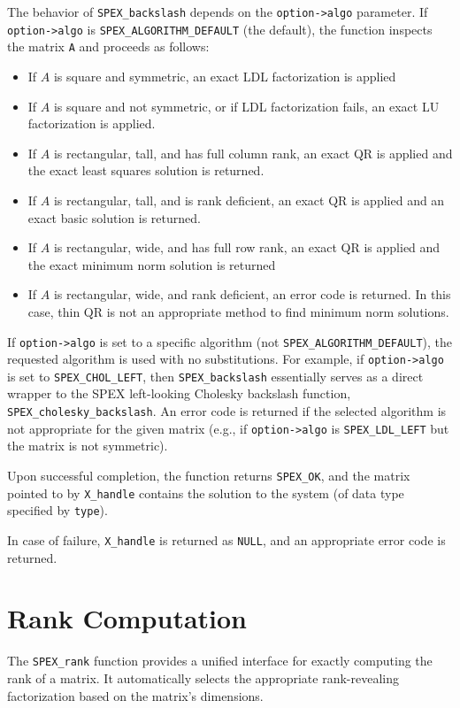 \documentclass[12pt,oneside]{book}
\theoremstyle{definition}
\begin{document}
The behavior of \verb|SPEX_backslash| depends on the \verb|option->algo|
parameter. If \verb|option->algo| is \verb|SPEX_ALGORITHM_DEFAULT| (the
default), the function inspects the matrix \verb|A| and proceeds as follows:
\begin{itemize}
    \item If $A$ is square and symmetric, an exact LDL factorization is applied
    \item If $A$ is square and not symmetric, or if LDL factorization fails, an exact LU factorization is applied.
    \item If $A$ is rectangular, tall, and has full column rank, an exact QR is applied and the exact least squares solution is returned.
    \item If $A$ is rectangular, tall, and is rank deficient, an exact QR is applied and an exact basic solution is returned.
    \item If $A$ is rectangular, wide, and has full row rank, an exact QR is applied and the exact minimum norm solution is returned
    \item If $A$ is rectangular, wide, and rank deficient, an error code is returned. In this case, thin QR is not an appropriate method to find minimum norm solutions.
\end{itemize}
If \verb|option->algo| is set to a specific algorithm (not
\verb|SPEX_ALGORITHM_DEFAULT|), the requested algorithm is used with no
substitutions. For example, if \verb|option->algo| is set to
\verb|SPEX_CHOL_LEFT|, then \verb|SPEX_backslash| essentially serves as a
direct wrapper to the SPEX left-looking Cholesky backslash function,
\verb|SPEX_cholesky_backslash|. An error code is returned if the
selected algorithm is not appropriate for the given matrix (e.g., if
\verb|option->algo| is \verb|SPEX_LDL_LEFT| but the matrix is not symmetric).

Upon successful completion, the function returns \verb|SPEX_OK|, and the matrix
pointed to by \verb|X_handle| contains the solution to the system (of data type
specified by \verb|type|).

In case of failure, \verb|X_handle| is returned as \verb|NULL|, and an
appropriate error code is returned.

\section{Rank Computation}
The \verb|SPEX_rank| function provides a unified interface for exactly
computing the rank of a matrix. It automatically selects the appropriate
rank-revealing factorization based on the matrix's dimensions.
\end{document}
